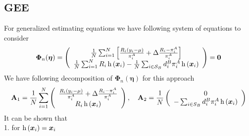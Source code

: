 \documentclass[
  letterpaper,
  DIV=11,
  numbers=noendperiod]{scrreprt}
\begin{document}
\hypertarget{gee}{%
\subsection{GEE}\label{gee}}

For generalized estimating equations we have following system of
equations to consider \[
\begin{equation}
\boldsymbol{\Phi}_n(\boldsymbol{\eta})=\left(\begin{array}{c}
\frac{1}{N} \sum_{i=1}^N\left[\frac{R_i\left(y_i-\mu\right)}{\pi_i^A}+\Delta \frac{R_i-\pi_i^A}{\pi_i^A}\right] \\
\frac{1}{N} \sum_{i=1}^N R_i \operatorname{h}\left(\bx_i\right)-\frac{1}{N} \sum_{i \in \mathcal{S}_B} d_i^B \pi_i^A \operatorname{h}\left(\bx_i\right)
\end{array}\right)=\mathbf{0}
\end{equation}
\] We have following decomposition of
\(\boldsymbol{\Phi}_n(\boldsymbol{\eta})\) for this approach \[
\begin{equation}
\mathbf{A}_1=\frac{1}{N} \sum_{i=1}^N\left(\begin{array}{c}
\frac{R_i\left(y_i-\mu\right)}{\pi_i^A}+\Delta \frac{R_i-\pi_i^A}{\pi_i^A} \\
R_i \operatorname{h}\left(\bx_i\right)
\end{array}\right), \quad \mathbf{A}_2=\frac{1}{N}\left(\begin{array}{c}
0 \\
- \sum_{i \in S_B} d_i^B \pi_i^A \operatorname{h}\left(\bx_i\right)
\end{array}\right)
\end{equation}
\] It can be shown that\\
1. for \(\operatorname{h}\left(\boldsymbol{x}_i\right) = \boldsymbol{x}_i\)
\end{document}
